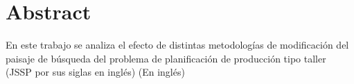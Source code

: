 \chapter*{Abstract}
En este trabajo se analiza el efecto de distintas metodologías de modificación del paisaje de búsqueda del problema de planificación de producción tipo taller (JSSP por sus siglas en inglés) (En inglés)

\let\cleardoublepage\clearpage
